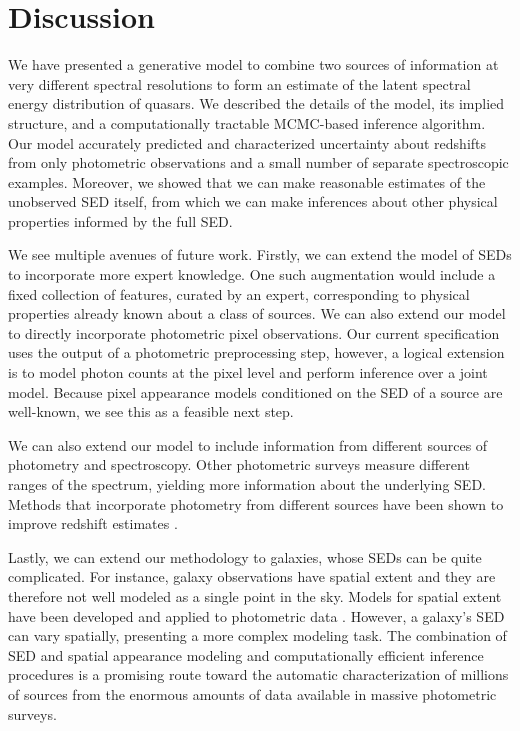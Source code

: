 \documentclass{article} %
\begin{document}
\section{Discussion}
We have presented a generative model to combine two sources of information at very different spectral resolutions to form an estimate of the latent spectral energy distribution of quasars.
We described the details of the model, its implied structure, and a computationally tractable MCMC-based inference algorithm. 
Our model accurately predicted and characterized uncertainty about redshifts from only photometric observations and a small number of separate spectroscopic examples. 
Moreover, we showed that we can make reasonable estimates of the unobserved SED itself, from which we can make inferences about other physical properties informed by the full SED.  
 
We see multiple avenues of future work.
Firstly, we can extend the model of SEDs to incorporate more expert knowledge.
One such augmentation would include a fixed collection of features, curated by an expert, corresponding to physical properties already known about a class of sources.  
We can also extend our model to directly incorporate photometric pixel observations.
Our current specification uses the output of a photometric preprocessing step, however, a logical extension is to model photon counts at the pixel level and perform inference over a joint model. 
Because pixel appearance models conditioned on the SED of a source are well-known, we see this as a feasible next step. 

We can also extend our model to include information from different sources of photometry and spectroscopy.
Other photometric surveys measure different ranges of the spectrum, yielding more information about the underlying SED.
Methods that incorporate photometry from different sources have been shown to improve redshift estimates \cite{brescia2013photometric}.  

Lastly, we can extend our methodology to galaxies, whose SEDs can be quite complicated.
For instance, galaxy observations have spatial extent and they are therefore not well modeled as a single point in the sky.  
Models for spatial extent have been developed and applied to photometric data \cite{hogg2013replacing, regier2015}.  
However, a galaxy's SED can vary spatially, presenting a more complex modeling task.    
The combination of SED and spatial appearance modeling and computationally efficient inference procedures is a promising route toward the automatic characterization of millions of sources from the enormous amounts of data available in massive photometric surveys.  
\end{document}
